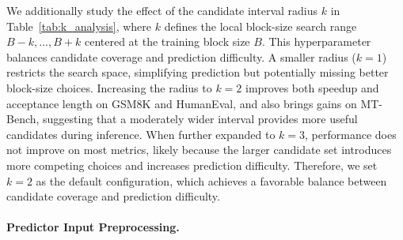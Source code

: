 \documentclass{llmxive}
\providecommand{\arraystretch}{1.15}
\begin{document}
We additionally study the effect of the candidate interval radius $k$ in Table~\ref{tab:k_analysis}, where $k$ defines the local block-size search range ${B-k,\ldots,B+k}$ centered at the training block size $B$. This hyperparameter balances candidate coverage and prediction difficulty. A smaller radius ($k=1$) restricts the search space, simplifying prediction but potentially missing better block-size choices. Increasing the radius to $k=2$ improves both speedup and acceptance length on GSM8K and HumanEval, and also brings gains on MT-Bench, suggesting that a moderately wider interval provides more useful candidates during inference. When further expanded to $k=3$, performance does not improve on most metrics, likely because the larger candidate set introduces more competing choices and increases prediction difficulty. Therefore, we set $k=2$ as the default configuration, which achieves a favorable balance between candidate coverage and prediction difficulty.



% 



\paragraph{Predictor Input Preprocessing.}

\begin{table}[t]
\vspace{-10pt}
\centering
\scriptsize
\setlength{\tabcolsep}{4.0pt}
\renewcommand{\arraystretch}{1.05}
\vspace{-10pt}

\caption{Effect of predictor input preprocessing on speedup and acceptance length ($\tau$).}
\label{tab:input_preprocessing}
\end{table}
\end{document}
